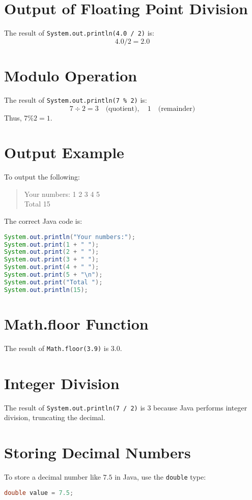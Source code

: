 \documentclass{article}
\begin{document}
\section{Output of Floating Point Division}
The result of \texttt{System.out.println(4.0 / 2)} is:
\[
4.0 / 2 = 2.0
\]

\section{Modulo Operation}
The result of \texttt{System.out.println(7 \% 2)} is:
\[
7 \div 2 = 3 \quad \text{(quotient)}, \quad 1 \quad \text{(remainder)} 
\]
Thus, $7 \% 2 = 1$.

\section{Output Example}
To output the following:
\begin{quote}
Your numbers: 1 2 3 4 5 \\
Total 15
\end{quote}
The correct Java code is:
\begin{lstlisting}[language=Java]
System.out.println("Your numbers:");
System.out.print(1 + " ");
System.out.print(2 + " ");
System.out.print(3 + " ");
System.out.print(4 + " ");
System.out.print(5 + "\n");
System.out.print("Total ");
System.out.println(15);
\end{lstlisting}

\section{Math.floor Function}
The result of \texttt{Math.floor(3.9)} is $3.0$.

\section{Integer Division}
The result of \texttt{System.out.println(7 / 2)} is $3$ because Java performs integer division, truncating the decimal.

\section{Storing Decimal Numbers}
To store a decimal number like $7.5$ in Java, use the \texttt{double} type:
\begin{lstlisting}[language=Java]
double value = 7.5;
\end{lstlisting}
\end{document}
